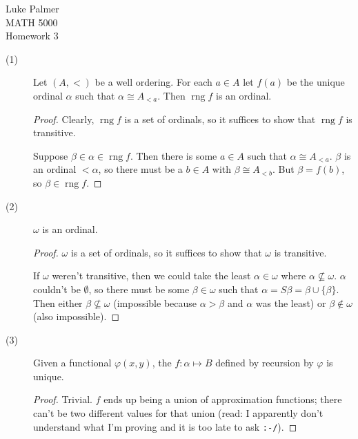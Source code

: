 \documentclass[12pt]{article}
\DeclareMathOperator{\rng}{rng}
\begin{document}
\noindent Luke Palmer \\
MATH 5000 \\
Homework 3

\begin{description}
\item[(1)] Let $(A,<)$ be a well ordering.  For each $a \in A$ let
$f(a)$ be the unique ordinal $\alpha$ such that $\alpha \cong A_{<a}$.
Then $\rng{f}$ is an ordinal.
  \begin{proof}
    Clearly, $\rng{f}$ is a set of ordinals, so it suffices to show that
	$\rng{f}$ is transitive.

	Suppose $\beta \in \alpha \in \rng{f}$.  Then there is some $a \in A$
	such that $\alpha \cong A_{<a}$.  $\beta$ is an ordinal $< \alpha$,
	so there must be a $b \in A$ with $\beta \cong A_{<b}$.  But $\beta
	= f(b)$, so $\beta \in \rng{f}$.
  \end{proof}

\item[(2)] $\omega$ is an ordinal.
  \begin{proof}
    $\omega$ is a set of ordinals, so it suffices to show that $\omega$
	is transitive.

	If $\omega$ weren't transitive, then we could take the least $\alpha
	\in \omega$ where $\alpha \not\subseteq \omega$.  $\alpha$ couldn't
	be $\emptyset$, so there must be some $\beta \in \omega$ such that
	$\alpha = S\beta = \beta \cup \{\beta\}$.  Then either $\beta
	\not\subseteq \omega$ (impossible because $\alpha > \beta$ and
	$\alpha$ was the least) or $\beta \not\in \omega$ (also impossible).
  \end{proof}

\item[(3)] Given a functional $\varphi(x,y)$, the $f: \alpha \mapsto B$
defined by recursion by $\varphi$ is unique.
  \begin{proof}
	Trivial.  $f$ ends up being a union of approximation functions;
	there can't be two different values for that union  (read:  I
	apparently don't understand what I'm proving and it is too late to
	ask \texttt{:-/}).
  \end{proof}


\end{description}
\end{document}
